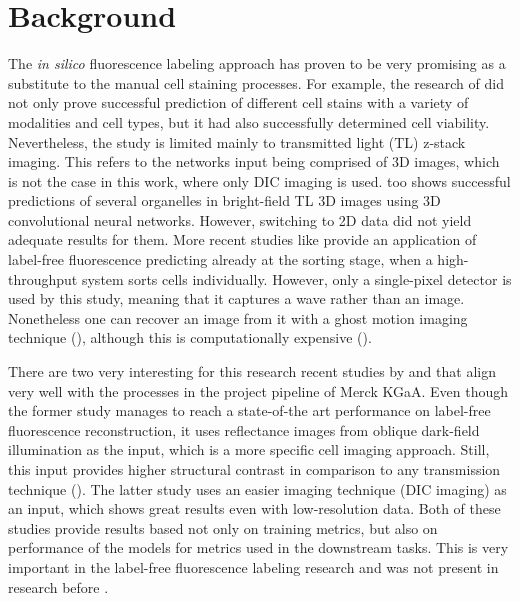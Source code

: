 \section{Background}

The \textit{in silico} fluorescence labeling approach has proven to be very promising as a substitute to the manual cell staining processes. For example, the research of \cite{Christiansen_2018} did not only prove successful prediction of different cell stains with a variety of modalities and cell types, but it had also successfully determined cell viability. Nevertheless, the study is limited mainly to transmitted light (TL) z-stack imaging. This refers to the networks input being comprised of 3D images, which is not the case in this work, where only DIC imaging is used. \cite{Ounkomol_2018} too shows successful predictions of several organelles in bright-field TL 3D images using 3D convolutional neural networks. However, switching to 2D data did not yield adequate results for them. More recent studies like \cite{Ugawa_2021} provide an application of label-free fluorescence predicting already at the sorting stage, when a high-throughput system sorts cells individually. However, only a single-pixel detector is used by this study, meaning that it captures a wave rather than an image. Nonetheless one can recover an image from it with a ghost motion imaging technique (\cite{Bromberg_2009}), although this is computationally expensive (\cite{Sadao_2018}).
    
There are two very interesting for this research recent studies by \cite{Cheng_2021} and \cite{Lachance_2020} that align very well with the processes in the project pipeline of Merck KGaA. Even though the former study manages to reach a state-of-the art performance on label-free fluorescence reconstruction, it uses reflectance images from oblique dark-field illumination as the input, which is a more specific cell imaging approach. Still, this input provides higher structural contrast in comparison to any transmission technique (\cite{Boustany_2010}). The latter study uses an easier imaging technique (DIC imaging) as an input, which shows great results even with low-resolution data. Both of these studies provide results based not only on training metrics, but also on performance of the models for metrics used in the downstream tasks. This is very important in the label-free fluorescence labeling research and was not present in research before \cite{Lachance_2020}.
    
